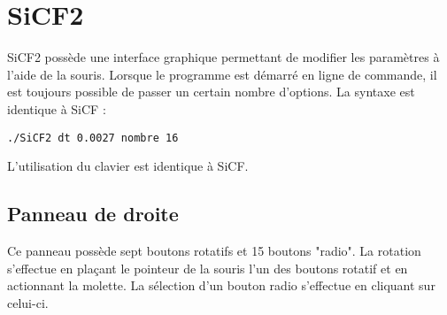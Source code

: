 %
\section{SiCF2}
%
%
SiCF2 possède une interface graphique permettant de modifier les paramètres à l'aide de la souris. Lorsque le programme est démarré en ligne de commande, il est toujours possible de passer un certain nombre d'options. La syntaxe est identique à SiCF :
\begin{center}
\texttt{./SiCF2 dt 0.0027 nombre 16}
\end{center}
L'utilisation du clavier est identique à SiCF. 
%
%
%
\subsection{Panneau de droite}
%
Ce panneau possède sept boutons rotatifs et 15 boutons "radio". La rotation s'effectue en plaçant le pointeur de la souris l'un des boutons rotatif et en actionnant la molette. La sélection d'un bouton radio s'effectue en cliquant sur celui-ci. 
%
%
